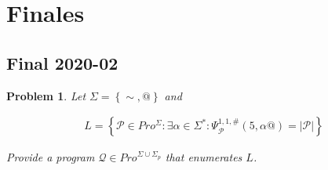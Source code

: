 \documentclass[a4paper, 12pt]{article}
\newtheorem{problem}{Problem}
\newtheorem{problem}{Problem}
\begin{document}
\pagebreak 

\section{Finales}

\subsection{Final 2020-02}

\begin{problem}
    Let $\Sigma = \left\{ \sim , @ \right\} $ and

    \begin{align*}
        L = \left\{ \mathcal{P} \in Pro^{\Sigma} : \exists \alpha \in \Sigma^{*}
        : \Psi_{\mathcal{P}}^{1, 1, \#}(5, \alpha@) = |\mathcal{P}|\right\} 
    \end{align*}

    Provide a program $\mathcal{Q} \in Pro^{\Sigma \cup \Sigma_p}$ that
    enumerates $L$.
\end{problem}
\end{document}

